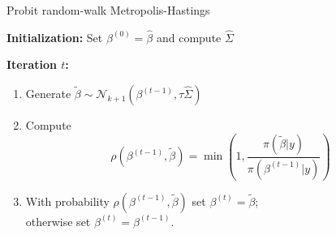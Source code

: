\begin{slide}

\begin{block}{Probit random-walk Metropolis-Hastings}
\begin{itemize}{\sffamily
\item[] {\bfseries Initialization:} Set $\beta^{(0)}=\hat\beta$ and compute $\hat\Sigma$
\item[] {\bfseries Iteration $t$:} 
\begin{enumerate}
\item Generate $\tilde\beta \sim \mathscr{N}_{k+1}(\beta^{(t-1)},\tau\hat\Sigma)$
\item Compute
$$
\rho(\beta^{(t-1)},\tilde\beta)=\min\left(1,\frac{\pi(\tilde\beta|y)}{\pi(\beta^{(t-1)}|y)}\right)
$$
\item With probability $\rho(\beta^{(t-1)},\tilde\beta)$ set $\beta^{(t)}=\tilde\beta$;\\
otherwise set $\beta^{(t)}=\beta^{(t-1)}$.
\end{enumerate}
}\end{itemize}
\end{block}

\end{slide}
